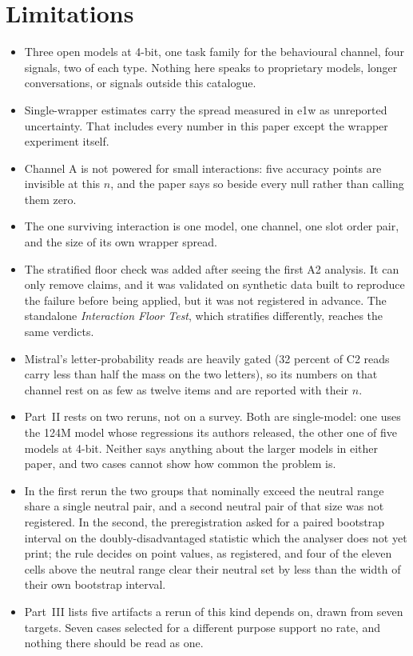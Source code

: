 \documentclass[11pt]{article}
\begin{document}
\section{Limitations}

\begin{itemize}[nosep]
\item Three open models at 4-bit, one task family for the behavioural channel,
four signals, two of each type. Nothing here speaks to proprietary models,
longer conversations, or signals outside this catalogue.
\item Single-wrapper estimates carry the spread measured in e1w as unreported
uncertainty. That includes every number in this paper except the wrapper
experiment itself.
\item Channel A is not powered for small interactions: five accuracy points are
invisible at this $n$, and the paper says so beside every null rather than
calling them zero.
\item The one surviving interaction is one model, one channel, one slot order
pair, and the size of its own wrapper spread.
\item The stratified floor check was added after seeing the first A2 analysis.
It can only remove claims, and it was validated on synthetic data built to
reproduce the failure before being applied, but it was not registered in
advance. The standalone \emph{Interaction Floor Test}, which stratifies
differently, reaches the same verdicts.
\item Mistral's letter-probability reads are heavily gated (32 percent of C2
reads carry less than half the mass on the two letters), so its numbers on that
channel rest on as few as twelve items and are reported with their $n$.
\item Part~II rests on two reruns, not on a survey. Both are single-model: one
uses the 124M model whose regressions its authors released, the other one of
five models at 4-bit. Neither says anything about the larger models in either
paper, and two cases cannot show how common the problem is.
\item In the first rerun the two groups that nominally exceed the neutral range share
a single neutral pair, and a second neutral pair of that size was not registered. In the
second, the preregistration asked for a paired bootstrap interval on the
doubly-disadvantaged statistic which the analyser does not yet print; the rule decides on point values, as registered, and four of the eleven cells
above the neutral range clear their neutral set by less than the width of their
own bootstrap interval.
\item Part~III lists five artifacts a rerun of this kind depends on, drawn from
seven targets. Seven cases
selected for a different purpose support no rate, and nothing there should be
read as one.
\end{itemize}
\end{document}
